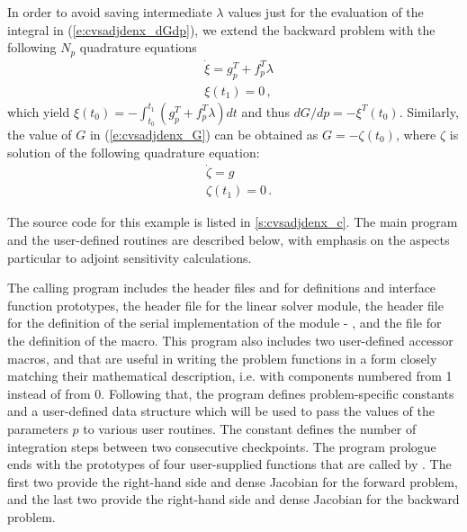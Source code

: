In order to avoid saving intermediate $\lambda$ values just for the
evaluation of the integral in (\ref{e:cvsadjdenx_dGdp}), we extend the
backward problem with the following $N_p$ quadrature equations
\begin{equation}\label{e:cvsadjdenx_XI}
  \begin{split}
    &{\dot\xi} = g_p^T + f_p^T \lambda \\
    &\xi (t_1) = 0 \, ,
  \end{split}
\end{equation}
which yield $\xi(t_0) = - \int_{t_0}^{t_1} ( g_p^T + f_p^T \lambda) dt$
and thus ${dG}/{dp} = -\xi^T(t_0)$.
Similarly, the value of $G$ in (\ref{e:cvsadjdenx_G}) can be obtained as
$G = - \zeta(t_0)$, where $\zeta$ is solution of the following quadrature
equation:
\begin{equation}\label{e:cvsadjdenx_ZETA}
  \begin{split}
    &{\dot\zeta} = g \\
    &\zeta(t_1) = 0 \, .
  \end{split}
\end{equation}

The source code for this example is listed in \A\ref{s:cvsadjdenx_c}.
The main program and the user-defined routines are described below, 
with emphasis on the aspects particular to adjoint sensitivity calculations.

The calling program includes the {\cvodes} header files  
and  for {\cvodes} definitions and interface function prototypes,
the header file  for the {\cvdense} linear solver module,
the header file  for the definition of the serial implementation
of the {\nvector} module - {\nvecs}, and the file  for the
definition of the  macro.
This program also includes two user-defined accessor macros,
 and 
that are useful in writing the problem functions in a form closely
matching their mathematical description, i.e. with components numbered from 1 instead of from 0. 
Following that, the program defines problem-specific constants and a user-defined 
data structure which will be used to pass the values of the parameters $p$ to various
user routines. The constant  defines the number of integration steps
between two consecutive checkpoints.
The program prologue ends with the prototypes of four user-supplied functions that are
called by {\cvodes}. The first two provide the right-hand side and dense Jacobian
for the forward problem, and the last two provide the right-hand side and dense Jacobian 
for the backward problem.

